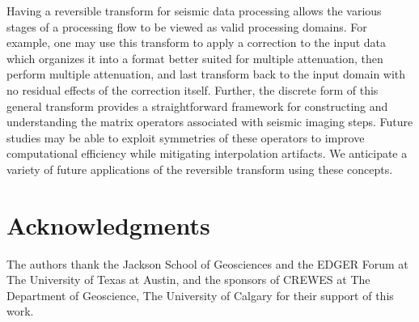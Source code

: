 Having a reversible transform for seismic data processing allows the various stages of a processing flow to be viewed as valid processing domains.  
For example, one may use this transform to apply a correction to the input data which organizes it into a format better suited for multiple attenuation, then perform multiple attenuation, and last transform back to the input domain with no residual effects of the correction itself.  
Further, the discrete form of this general transform provides a straightforward framework for constructing and understanding the matrix operators associated with seismic imaging steps.  
Future studies may be able to exploit symmetries of these operators to improve computational efficiency while mitigating interpolation artifacts.
We anticipate a variety of future applications of the reversible transform using these concepts.






\section{Acknowledgments}
The authors thank the Jackson School of Geosciences and the EDGER Forum at The University of Texas at Austin, and the sponsors of CREWES at The Department of Geoscience, The University of Calgary for their support of this work.




